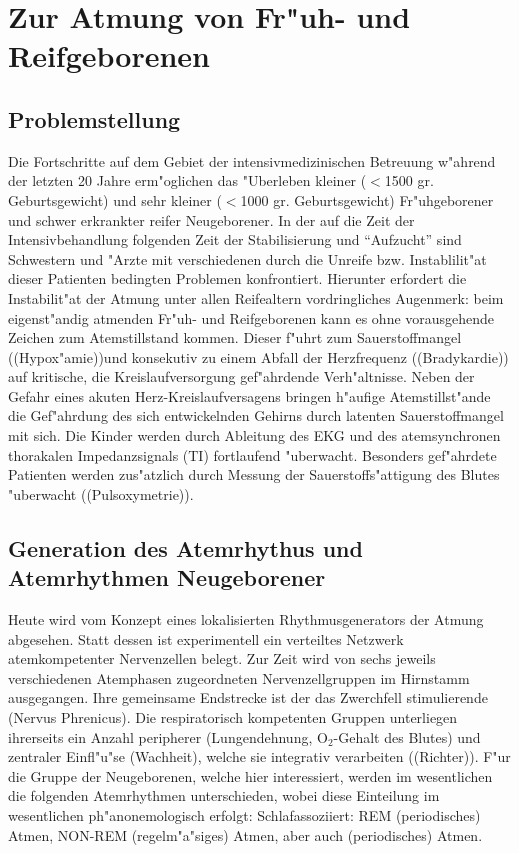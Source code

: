 \section{Zur Atmung von Fr"uh- und Reifgeborenen}


\subsection{Problemstellung}

Die Fortschritte auf dem Gebiet der intensivmedizinischen Betreuung w"ahrend der letzten
20 Jahre erm"oglichen das "Uberleben kleiner ($<$1500 gr. Geburtsgewicht) und sehr kleiner
($<$1000 gr. Geburtsgewicht) Fr"uhgeborener und schwer erkrankter reifer Neugeborener. In
der auf die Zeit der Intensivbehandlung folgenden Zeit der Stabilisierung und ``Aufzucht''
sind Schwestern und "Arzte mit verschiedenen durch die Unreife bzw. Instablilit"at dieser
Patienten bedingten Problemen konfrontiert. Hierunter erfordert die Instabilit"at der
Atmung unter allen Reifealtern vordringliches Augenmerk: beim eigenst"andig atmenden
Fr"uh- und Reifgeborenen kann es ohne vorausgehende Zeichen zum Atemstillstand kommen.
Dieser f"uhrt zum Sauerstoffmangel (\begriff(Hypox"amie))und konsekutiv zu einem Abfall
der Herzfrequenz (\begriff(Bradykardie)) auf kritische, die Kreislaufversorgung gef"ahrdende
Verh"altnisse. Neben der Gefahr eines akuten Herz-Kreislaufversagens bringen h"aufige
Atemstillst"ande die Gef"ahrdung des sich entwickelnden Gehirns durch latenten
Sauerstoffmangel mit sich. Die Kinder werden durch Ableitung des EKG und des
atemsynchronen thorakalen Impedanzsignals (TI) fortlaufend "uberwacht. Besonders gef"ahrdete
Patienten werden zus"atzlich durch Messung der Sauerstoffs"attigung des Blutes "uberwacht
(\begriff(Pulsoxymetrie)).

\subsection{Generation des Atemrhythus und Atemrhythmen Neugeborener}

Heute wird vom Konzept eines lokalisierten Rhythmusgenerators der Atmung abgesehen. Statt
dessen ist experimentell ein verteiltes Netzwerk atemkompetenter Nervenzellen belegt. Zur
Zeit wird von sechs jeweils verschiedenen Atemphasen zugeordneten Nervenzellgruppen im
Hirnstamm ausgegangen. Ihre gemeinsame Endstrecke ist der das Zwerchfell stimulierende
\begriff(Nervus Phrenicus). Die respiratorisch kompetenten Gruppen unterliegen ihrerseits
ein Anzahl peripherer (Lungendehnung, $\mathrm{O}_2$-Gehalt des Blutes) und zentraler
Einfl"u"se (Wachheit), welche sie integrativ verarbeiten (\autor(Richter)). F"ur die
Gruppe der Neugeborenen, welche hier interessiert, werden im wesentlichen die folgenden
Atemrhythmen unterschieden, wobei diese Einteilung im wesentlichen ph"anonemologisch
erfolgt: Schlafassoziiert: REM \begriff(periodisches) Atmen, NON-REM
\begriff(regelm"a"siges) Atmen, aber auch \begriff(periodisches) Atmen.

